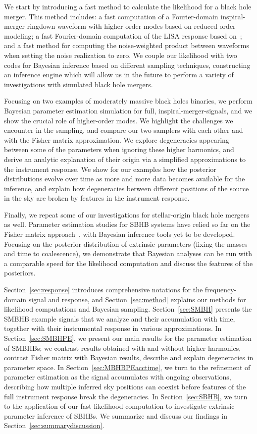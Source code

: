\documentclass[aps,showpacs,twocolumn,prd,superscriptaddress,nofootinbib]{revtex4-1}
\begin{document}
We start by introducing a fast method to calculate the likelihood for a black hole merger. This method includes: a fast computation of a Fourier-domain inspiral-merger-ringdown waveform with higher-order modes based on reduced-order modeling; a fast Fourier-domain computation of the LISA response based on~\cite{MB18}; and a fast method for computing the noise-weighted product between waveforms when setting the noise realization to zero. We couple our likelihood with two codes for Bayesian inference based on different sampling techniques, constructing an inference engine which will allow us in the future to perform a variety of investigations with simulated black hole mergers.

Focusing on two examples of moderately massive black holes binaries, we perform Bayesian parameter estimation simulation for full, inspiral-merger-signals, and we show the crucial role of higher-order modes. We highlight the challenges we encounter in the sampling, and compare our two samplers with each other and with the Fisher matrix approximation. We explore degeneracies appearing between some of the parameters when ignoring these higher harmonics, and derive an analytic explanation of their origin via a simplified approximations to the instrument response. We show for our examples how the posterior distributions evolve over time as more and more data becomes available for the inference, and explain how degeneracies between different positions of the source in the sky are broken by features in the instrument response.

Finally, we repeat some of our investigations for stellar-origin black hole mergers as well. Parameter estimation studies for SBHB systems have relied so far on the Fisher matrix approach~\cite{Sesana16, Vitale16, Nishizawa+16a, Nishizawa+16b}, with Bayesian inference tools yet to be developed. Focusing on the posterior distribution of extrinsic parameters (fixing the masses and time to coalescence), we demonstrate that Bayesian analyses can be run with a comparable speed for the likelihood computation and discuss the features of the posteriors.

Section~\ref{sec:response} introduces comprehensive notations for the frequency-domain signal and response, and Section~\ref{sec:method} explains our methods for likelihood computations and Bayesian sampling. Section~\ref{sec:SMBH} presents the SMBHB example signals that we analyze and their accumulation with time, together with their instrumental response in various approximations. In Section~\ref{sec:SMBHPE}, we present our main results for the parameter estimation of SMBHBs; we contrast results obtained with and without higher harmonics, contrast Fisher matrix with Bayesian results, describe and explain degeneracies in parameter space. In Section~\ref{sec:MBHBPEacctime}, we turn to the refinement of parameter estimation as the signal accumulates with ongoing observations, describing how multiple inferred sky positions can coexist before features of the full instrument response break the degeneracies. In Section~\ref{sec:SBHB}, we turn to the application of our fast likelihood computation to investigate extrinsic parameter inference of SBHBs. We summarize and discuss our findings in Section~\ref{sec:summarydiscussion}.
\end{document}
